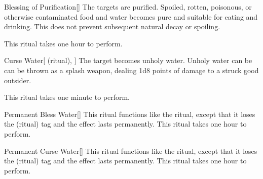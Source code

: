 \lowercase{\hypertarget{spell:Blessing of Purification}{}}\label{spell:Blessing of Purification}
\begin{apability}[Rank 1]{\hypertarget{spell:Blessing of Purification}{Blessing of Purification}}[]
The targets are purified.
Spoiled, rotten, poisonous, or otherwise contaminated food and water becomes pure and suitable for eating and drinking.
This does not prevent subsequent natural decay or spoiling.

This ritual takes one hour to perform.
\end{apability}
\vspace{0.25em}



\lowercase{\hypertarget{spell:Curse Water}{}}\label{spell:Curse Water}
\begin{attuneability}[Rank 1]{\hypertarget{spell:Curse Water}{Curse Water}}[ (ritual), ]
The target becomes unholy water.
Unholy water can be can be thrown as a splash weapon, dealing 1d8 points of damage to a struck good outsider.

This ritual takes one minute to perform.
\end{attuneability}
\vspace{0.25em}



\lowercase{\hypertarget{spell:Permanent Bless Water}{}}\label{spell:Permanent Bless Water}
\begin{apability}[Rank 3]{\hypertarget{spell:Permanent Bless Water}{Permanent Bless Water}}[]
This ritual functions like the  ritual, except that it loses the  (ritual) tag and the effect lasts permanently.
This ritual takes one hour to perform.
\end{apability}
\vspace{0.25em}



\lowercase{\hypertarget{spell:Permanent Curse Water}{}}\label{spell:Permanent Curse Water}
\begin{apability}[Rank 3]{\hypertarget{spell:Permanent Curse Water}{Permanent Curse Water}}[]
This ritual functions like the  ritual, except that it loses the  (ritual) tag and the effect lasts permanently.
This ritual takes one hour to perform.
\end{apability}
\vspace{0.25em}



